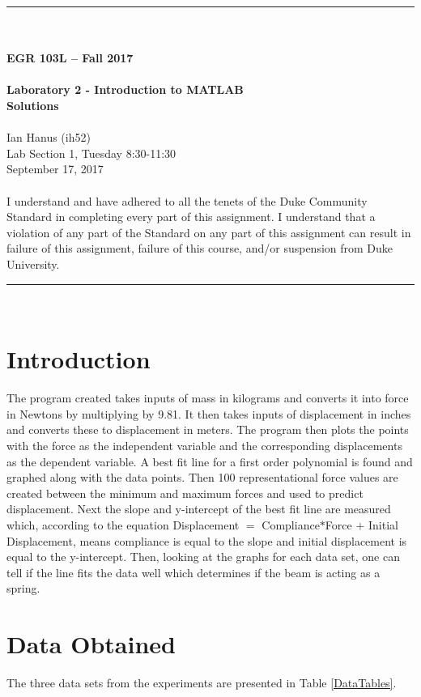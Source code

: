 \documentclass{article}
\begin{document}
\begin{center}
\rule{6.5in}{0.5mm}\\~\\
\textbf{\large EGR 103L -- Fall 2017}\\~\\
\textbf{\huge Laboratory 2 - Introduction to MATLAB\\
Solutions}\\~\\
Ian Hanus (ih52)\\
Lab Section 1, Tuesday 8:30-11:30\\
September 17, 2017\\~\\
{\small I understand and have adhered to all the tenets of the Duke
  Community Standard in completing every part of this assignment.  I
  understand that a violation of any part of the Standard on any part
  of this assignment can result in failure of this assignment, failure
  of this course, and/or suspension from Duke University.} 
\rule{6.5in}{0.5mm}\\
\end{center}
\tableofcontents
\listoffigures
\pagebreak

\section{Introduction}
The program created takes inputs of mass in kilograms and converts it into force in Newtons by multiplying by 9.81. It then takes inputs of displacement in inches and converts these to displacement in meters. The program then plots the points with the force as the independent variable and the corresponding displacements as the dependent variable. A best fit line for a first order polynomial is found and graphed along with the data points. Then 100 representational force values are created between the minimum and maximum forces and used to predict displacement. Next the slope and y-intercept of the best fit line are  measured which, according to the equation Displacement $=$ Compliance$*$Force $+$ Initial Displacement, means compliance is equal to the slope and initial displacement is equal to the y-intercept. Then, looking at the graphs for each data set, one can tell if the line fits the data well which determines if the beam is acting as a spring.

\section{Data Obtained}
The three data sets from the experiments are presented in Table
\ref{DataTables}.
\end{document}
